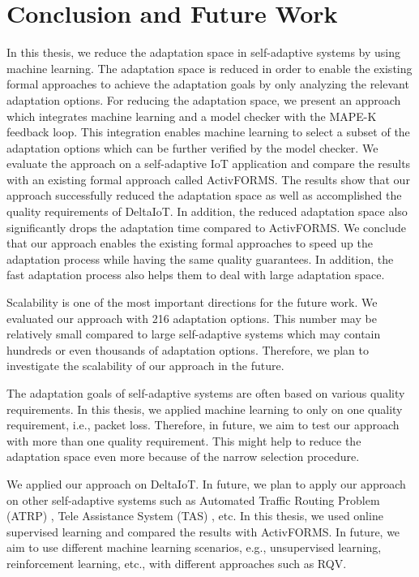 \documentclass[a4paper,12pt]{article}
\begin{document}
\section{Conclusion and Future Work} \label{Conclusion}
In this thesis, we reduce the adaptation space in self-adaptive systems by using machine learning. The adaptation space is reduced in order to enable the existing formal approaches to achieve the adaptation goals by only analyzing the relevant adaptation options. For reducing the adaptation space, we present an approach which integrates machine learning and a model checker with the MAPE-K feedback loop. This integration enables machine learning to select a subset of the adaptation options which can be further verified by the model checker. We evaluate the approach on a self-adaptive IoT application and compare the results with an existing formal approach called ActivFORMS. The results show that our approach successfully reduced the adaptation space as well as accomplished the quality requirements of DeltaIoT. In addition, the reduced adaptation space also significantly drops the adaptation time compared to ActivFORMS. We conclude that our approach enables the existing formal approaches to speed up the adaptation process while having the same quality guarantees. In addition, the fast adaptation process also helps them to deal with large adaptation space.

Scalability is one of the most important directions for the future work. We evaluated our approach with 216 adaptation options. This number may be relatively small compared to large self-adaptive systems which may contain hundreds or even thousands of adaptation options. Therefore, we plan to investigate the scalability of our approach in the future.

The adaptation goals of self-adaptive systems are often based on various quality requirements. In this thesis, we applied machine learning to only on one quality requirement, i.e., packet loss. Therefore, in future, we aim to test our approach with more than one quality requirement. This might help to reduce the adaptation space even more because of the narrow selection procedure.

We applied our approach on DeltaIoT. In future, we plan to apply our approach on other self-adaptive systems such as Automated Traffic Routing Problem (ATRP) \cite{TRFESA-2012}, Tele Assistance System (TAS) \cite{TAASASBSE-2015}, etc. In this thesis, we used online supervised learning and compared the results with ActivFORMS. In future, we aim to use different machine learning scenarios, e.g., unsupervised learning, reinforcement learning, etc., with different approaches such as RQV. 
\newpage
\hypersetup{urlcolor=black} 


\newpage
{}
\setcounter{page}{1}
\appendix
\end{document}
